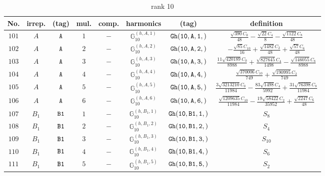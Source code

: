 \documentclass[fleqn,8pt]{jsarticle}
\begin{document}
\begin{table}[ht!]
\begin{center}
\caption{rank 10}
\renewcommand{\arraystretch}{1.3}
\begin{tabular}{cccccccc} \hline \hline
No. & irrep. & (tag) & mul. & comp. & harmonics & (tag) & definition \\ \hline
$ 101 $ & $ A $ & $ {\tt A} $ & $ 1 $ & $ - $ & $ \mathbb{G}_{10}^{(h,A,1)} $ & $ {\tt Gh(10,A,1,)} $ & $ \frac{\sqrt{390} C_{0}}{48} - \frac{\sqrt{22} C_{4}}{8} - \frac{\sqrt{1122} C_{8}}{48} $ \\
$ 102 $ & $ A $ & $ {\tt A} $ & $ 2 $ & $ - $ & $ \mathbb{G}_{10}^{(h,A,2)} $ & $ {\tt Gh(10,A,2,)} $ & $ - \frac{\sqrt{85} C_{10}}{16} + \frac{\sqrt{1482} C_{2}}{48} + \frac{\sqrt{57} C_{6}}{48} $ \\
$ 103 $ & $ A $ & $ {\tt A} $ & $ 3 $ & $ - $ & $ \mathbb{G}_{10}^{(h,A,3)} $ & $ {\tt Gh(10,A,3,)} $ & $ \frac{11 \sqrt{420189} C_{0}}{8988} + \frac{\sqrt{827645} C_{4}}{1498} - \frac{\sqrt{146055} C_{8}}{8988} $ \\
$ 104 $ & $ A $ & $ {\tt A} $ & $ 4 $ & $ - $ & $ \mathbb{G}_{10}^{(h,A,4)} $ & $ {\tt Gh(10,A,4,)} $ & $ \frac{\sqrt{370006} C_{10}}{749} + \frac{\sqrt{190995} C_{2}}{749} $ \\
$ 105 $ & $ A $ & $ {\tt A} $ & $ 5 $ & $ - $ & $ \mathbb{G}_{10}^{(h,A,5)} $ & $ {\tt Gh(10,A,5,)} $ & $ \frac{3 \sqrt{3213210} C_{0}}{11984} - \frac{83 \sqrt{1498} C_{4}}{5992} + \frac{31 \sqrt{76398} C_{8}}{11984} $ \\
$ 106 $ & $ A $ & $ {\tt A} $ & $ 6 $ & $ - $ & $ \mathbb{G}_{10}^{(h,A,6)} $ & $ {\tt Gh(10,A,6,)} $ & $ \frac{\sqrt{1209635} C_{10}}{11984} - \frac{19 \sqrt{58422} C_{2}}{35952} + \frac{\sqrt{2247} C_{6}}{48} $ \\
$ 107 $ & $ B_{1} $ & $ {\tt B1} $ & $ 1 $ & $ - $ & $ \mathbb{G}_{10}^{(h,B_{1},1)} $ & $ {\tt Gh(10,B1,1,)} $ & $ S_{8} $ \\
$ 108 $ & $ B_{1} $ & $ {\tt B1} $ & $ 2 $ & $ - $ & $ \mathbb{G}_{10}^{(h,B_{1},2)} $ & $ {\tt Gh(10,B1,2,)} $ & $ S_{4} $ \\
$ 109 $ & $ B_{1} $ & $ {\tt B1} $ & $ 3 $ & $ - $ & $ \mathbb{G}_{10}^{(h,B_{1},3)} $ & $ {\tt Gh(10,B1,3,)} $ & $ S_{10} $ \\
$ 110 $ & $ B_{1} $ & $ {\tt B1} $ & $ 4 $ & $ - $ & $ \mathbb{G}_{10}^{(h,B_{1},4)} $ & $ {\tt Gh(10,B1,4,)} $ & $ S_{6} $ \\
$ 111 $ & $ B_{1} $ & $ {\tt B1} $ & $ 5 $ & $ - $ & $ \mathbb{G}_{10}^{(h,B_{1},5)} $ & $ {\tt Gh(10,B1,5,)} $ & $ S_{2} $ \\

\end{tabular}
\end{center}
\end{table}
\end{document}
